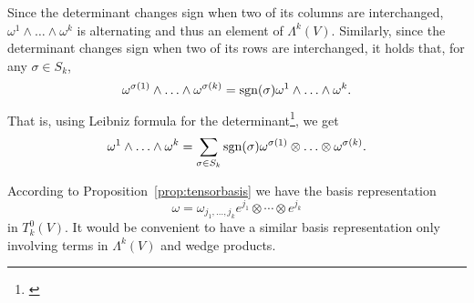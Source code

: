 Since the determinant changes sign when two of its columns are interchanged, $\omega^1\wedge\ldots\wedge\omega^k$ is alternating and thus an element of $\Lambda^k(V)$.
Similarly, since the determinant changes sign when two of its rows are interchanged, it holds that, for any $\sigma\in S_k$,
\begin{equation}\label{equiv:permut}
	\omega^{\sigma(1)}\wedge\ldots\wedge\omega^{\sigma(k)} = \operatorname{sgn}(\sigma) \omega^1\wedge\ldots\wedge\omega^k.
\end{equation}
That is, using Leibniz formula for the determinant\footnote{\cite[Equation (B.3)]{book:lee}}, we get
\begin{equation}\label{eq:detLeibniz}
	\omega^1\wedge\ldots\wedge\omega^k = \sum_{\sigma\in S_k}\operatorname{sgn}(\sigma) \omega^{\sigma(1)}\otimes\ldots\otimes\omega^{\sigma(k)}.
\end{equation}

According to Proposition~\ref{prop:tensorbasis} we have the basis representation
\begin{equation}
	\omega = \omega_{j_1, \ldots, j_k} e^{j_1}\otimes \cdots \otimes e^{j_k}
\end{equation}
in $T_k^0(V)$.
It would be convenient to have a similar basis representation only involving terms in $\Lambda^k(V)$ and wedge products.

